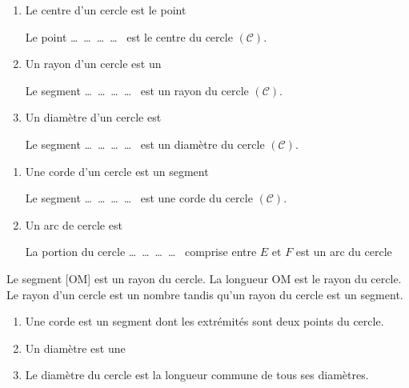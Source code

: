 \documentclass[a4paper,10pt]{report}
\begin{document}
\hspace{0.2mm}
\begin{minipage}{11cm}
\begin{enumerate}
\item[•] Le centre d'un cercle est le point \dotfill \medskip

\dotfill \medskip

Le point \dots ~\dots ~\dots ~\dots ~ est le centre du cercle $(\mathcal{C})$.\medskip
\item[•] Un rayon d'un cercle est un \dotfill \medskip

\dotfill \medskip

Le segment \dots ~\dots ~\dots ~\dots ~ est un rayon du cercle $(\mathcal{C})$.\medskip
\item[•] Un diamètre d'un cercle est \dotfill \medskip

\dotfill \medskip

Le segment \dots ~\dots ~\dots ~\dots ~ est un diamètre du cercle $(\mathcal{C})$.\medskip
\end{enumerate}
\end{minipage}
\noindent \begin{enumerate}
\item[•] Une corde d'un cercle est un segment \dotfill \medskip

\dotfill \medskip

Le segment \dots ~\dots ~\dots ~\dots ~  est une corde du cercle $(\mathcal{C})$.\medskip
\item[•] Un arc de cercle est \dotfill \medskip

\dotfill \medskip

La portion du cercle \dots ~\dots ~\dots ~\dots ~ comprise entre $E$ et $F$ est un arc du cercle 
\end{enumerate}

\begin{rem}
Le segment [OM] est un rayon du cercle. La longueur OM est le rayon du cercle. Le rayon d’un cercle est un nombre tandis qu’un rayon du cercle est un segment.
\end{rem}

\begin{defn}
\begin{enumerate}
\item[•] Une corde est un segment dont les extrémités sont deux points du cercle.\medskip
\item[•] Un diamètre est une \dotfill
\item[•] Le diamètre du cercle est la longueur commune de tous ses diamètres.
\end{enumerate}
\end{defn}
\end{document}
